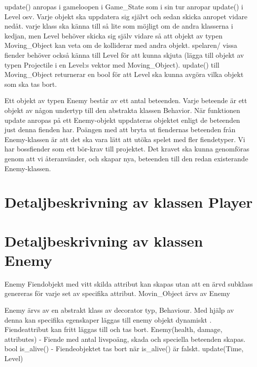\documentclass{TDP005mall}
\begin{document}
update() anropas i gameloopen i Game\_State som i sin tur anropar update() i Level osv. Varje objekt ska uppdatera sig självt och sedan skicka anropet vidare nedåt. varje klass ska känna till så lite som möjligt om de andra klasserna i kedjan, men Level behöver skicka sig själv vidare så att objekt av typen Moving\_Object kan veta om de kolliderar med andra objekt. spelaren/ vissa fiender behöver också känna till Level för att kunna skjuta (lägga till objekt av typen Projectile i en Level:s vektor med Moving\_Object). update() till Moving\_Object returnerar en bool för att Level ska kunna avgöra vilka objekt som ska tas bort.

Ett objekt av typen Enemy består av ett antal beteenden. Varje beteende är ett objekt av någon undertyp till den abstrakta klassen Behavior. När funktionen update anropas på ett Enemy-objekt uppdateras objektet enligt de beteenden just denna fienden har. Poängen med att bryta ut fiendernas beteenden från Enemy-klassen är att det ska vara lätt att utöka spelet med fler fiendetyper. Vi har bossfiender som ett bör-krav till projektet. Det kravet ska kunna genomföras genom att vi återanvänder, och skapar nya, beteenden till den redan existerande Enemy-klassen.  

\section{Detaljbeskrivning av klassen Player}

\section{Detaljbeskrivning av klassen Enemy}


Enemy 
Fiendobjekt med vitt skilda attribut kan skapas utan att en ärvd subklass genereras för varje set av specifika attribut. 
Movin_Object ärvs av Enemy

Enemy ärvs av en abstrakt klass av decorator typ, Behaviour. Med hjälp av denna kan specifika egenskaper läggas till enemy objekt dynamiskt \textcite[p.196]{Design Patterns}. Fiendeattribut kan fritt läggas till och tas bort.
Enemy(health, damage, attributes) - Fiende med antal livspoäng, skada och speciella beteenden skapas.
bool is_alive() -  Fiendeobjektet tas bort när is_alive() är falskt.
update(Time, Level)
\end{document}
